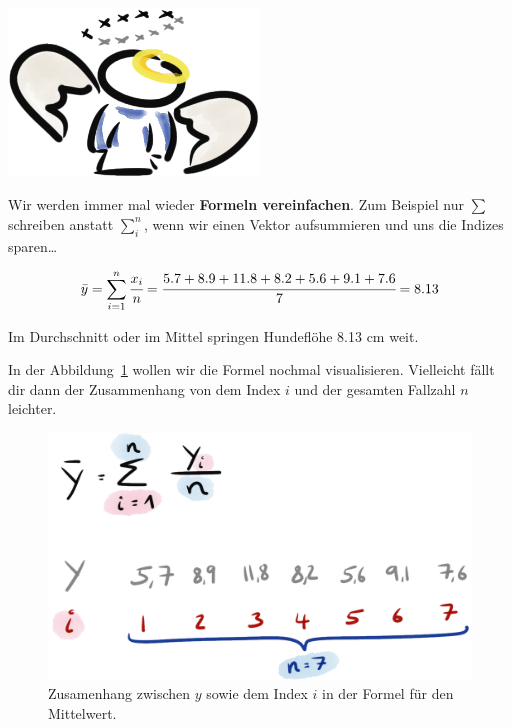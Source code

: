 \documentclass[
  letterpaper,
]{scrbook}
\begin{document}
\begin{marginfigure}

{\centering \includegraphics[width=0.5\textwidth,height=\textheight]{./images/angel_01.png}

}

\end{marginfigure}

Wir werden immer mal wieder \textbf{Formeln vereinfachen}. Zum Beispiel
nur \(\sum\) schreiben anstatt \(\sum_i^n\), wenn wir einen Vektor
aufsummieren und uns die Indizes sparen\ldots{}

\[
\bar{y} = \sum_{i=1}^{n}\cfrac{x_i}{n} =
\cfrac{5.7 + 8.9 + 11.8 + 8.2 + 5.6 + 9.1 + 7.6}{7} =
8.13
\]

Im Durchschnitt oder im Mittel springen Hundeflöhe 8.13 cm weit.

In der Abbildung~\ref{fig-index-drawn} wollen wir die Formel nochmal
visualisieren. Vielleicht fällt dir dann der Zusammenhang von dem Index
\(i\) und der gesamten Fallzahl \(n\) leichter.

\begin{figure}

{\centering \includegraphics[width=1\textwidth,height=\textheight]{./images/index-drawn.png}

}

\caption{\label{fig-index-drawn}Zusamenhang zwischen \(y\) sowie dem
Index \(i\) in der Formel für den Mittelwert.}

\end{figure}
\end{document}
